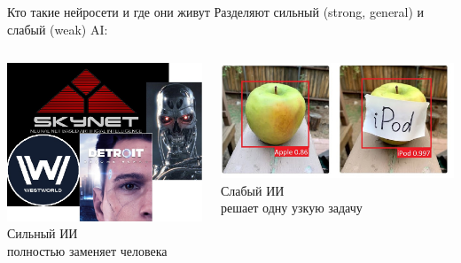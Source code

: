 \documentclass[aspectratio=169, professionalfonts]{beamer}
\begin{document}
\begin{frame}{Кто такие нейросети и где они живут}
    Разделяют сильный (strong, general) и слабый (weak) AI:
    \begin{columns}
        \begin{column}{.35\linewidth}
            \centering
            \includegraphics[width=\linewidth]{graphs/fig4_1.jpg}
            Сильный ИИ \\
            \footnotesize{полностью заменяет человека}
        \end{column}
        \begin{column}{.35\linewidth}
            \centering
            \includegraphics[width=\linewidth]{graphs/fig4_2.jpg}
            Слабый ИИ \\
            \footnotesize{решает одну узкую задачу}
        \end{column}
    \end{columns}
\end{frame}
\end{document}
